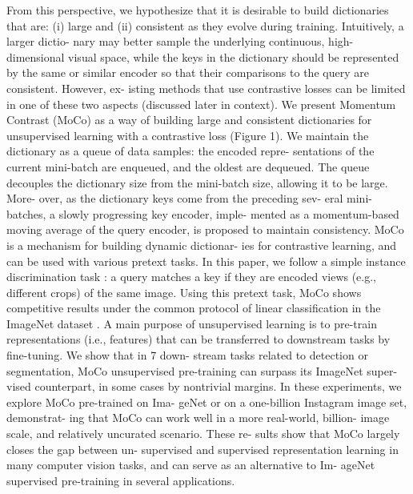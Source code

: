 \documentclass[10pt,twocolumn]{article}  %
\begin{document}
From this perspective, we hypothesize that it is desirable
to build dictionaries that are: (i) large and (ii) consistent
as they evolve during training. Intuitively, a larger dictio-
nary may better sample the underlying continuous, high-
dimensional visual space, while the keys in the dictionary
should be represented by the same or similar encoder so that
their comparisons to the query are consistent. However, ex-
isting methods that use contrastive losses can be limited in
one of these two aspects (discussed later in context).
We present Momentum Contrast (MoCo) as a way of
building large and consistent dictionaries for unsupervised
learning with a contrastive loss (Figure 1). We maintain the
dictionary as a queue of data samples: the encoded repre-
sentations of the current mini-batch are enqueued, and the
oldest are dequeued. The queue decouples the dictionary
size from the mini-batch size, allowing it to be large. More-
over, as the dictionary keys come from the preceding sev-
eral mini-batches, a slowly progressing key encoder, imple-
mented as a momentum-based moving average of the query
encoder, is proposed to maintain consistency.
MoCo is a mechanism for building dynamic dictionar-
ies for contrastive learning, and can be used with various
pretext tasks. In this paper, we follow a simple instance
discrimination task \cite{61_wu2018unsupervised, 63_he2019momentum, 2_bachman2019learning}:
a query matches a key if
they are encoded views (e.g., different crops) of the same
image. Using this pretext task, MoCo shows competitive
results under the common protocol of linear classiﬁcation
in the ImageNet dataset \cite{11_deng2009imagenet}.
A main purpose of unsupervised learning is to pre-train
representations (i.e., features) that can be transferred to
downstream tasks by ﬁne-tuning. We show that in 7 down-
stream tasks related to detection or segmentation, MoCo
unsupervised pre-training can surpass its ImageNet super-
vised counterpart, in some cases by nontrivial margins. In
these experiments, we explore MoCo pre-trained on Ima-
geNet or on a one-billion Instagram image set, demonstrat-
ing that MoCo can work well in a more real-world, billion-
image scale, and relatively uncurated scenario. These re-
sults show that MoCo largely closes the gap between un-
supervised and supervised representation learning in many
computer vision tasks, and can serve as an alternative to Im-
ageNet supervised pre-training in several applications.
\end{document}

